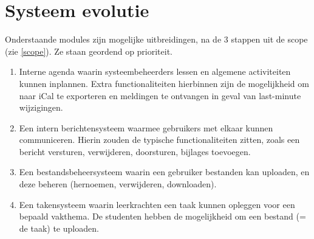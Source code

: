 \documentclass[a4paper]{article}
\begin{document}
\section{Systeem evolutie}
Onderstaande modules zijn mogelijke uitbreidingen, na de $3$ stappen uit de scope (zie \ref{scope}). Ze staan geordend op prioriteit.
\begin{enumerate}
    \item Interne agenda waarin systeembeheerders lessen en algemene activiteiten kunnen inplannen. Extra functionaliteiten hierbinnen zijn de mogelijkheid om naar iCal te exporteren en meldingen te ontvangen in geval van last-minute wijzigingen.
    \item Een intern berichtensysteem waarmee gebruikers met elkaar kunnen communiceren. Hierin zouden de typische functionaliteiten zitten, zoals een bericht versturen, verwijderen, doorsturen, bijlages toevoegen.
    \item Een bestandsbeheersysteem waarin een gebruiker bestanden kan uploaden, en deze beheren (hernoemen, verwijderen, downloaden).
    \item Een takensysteem waarin leerkrachten een taak kunnen opleggen voor een bepaald vakthema. De studenten hebben de mogelijkheid om een bestand (= de taak) te uploaden.
\end{enumerate}
\end{document}
